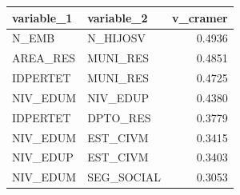 \begin{tabular}{llr}
\toprule
variable\_1 & variable\_2 & v\_cramer \\
\midrule
N\_EMB & N\_HIJOSV & 0.4936 \\
AREA\_RES & MUNI\_RES & 0.4851 \\
IDPERTET & MUNI\_RES & 0.4725 \\
NIV\_EDUM & NIV\_EDUP & 0.4380 \\
IDPERTET & DPTO\_RES & 0.3779 \\
NIV\_EDUM & EST\_CIVM & 0.3415 \\
NIV\_EDUP & EST\_CIVM & 0.3403 \\
NIV\_EDUM & SEG\_SOCIAL & 0.3053 \\
\bottomrule
\end{tabular}
